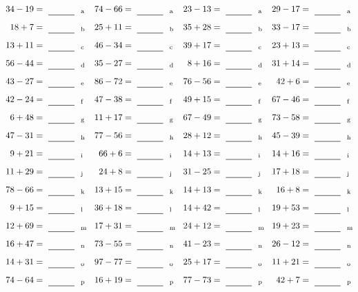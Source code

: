 \documentclass
[
  draft    = true,
  fontsize = 11pt,
  parskip  = half-
]
{scrartcl}
\begin{document}
\clearpage
\begin{align*}
    \pline{34-19}&=\rline{a}
  & \pline{74-66}&=\rline{a}
  & \pline{23-13}&=\rline{a}
  & \pline{29-17}&=\rline{a} \\[1ex]
    \pline{18+7}&=\rline{b}
  & \pline{25+11}&=\rline{b}
  & \pline{35+28}&=\rline{b}
  & \pline{33-17}&=\rline{b} \\[1ex]
    \pline{13+11}&=\rline{c}
  & \pline{46-34}&=\rline{c}
  & \pline{39+17}&=\rline{c}
  & \pline{23+13}&=\rline{c} \\[1ex]
    \pline{56-44}&=\rline{d}
  & \pline{35-27}&=\rline{d}
  & \pline{8+16}&=\rline{d}
  & \pline{31+14}&=\rline{d} \\[1ex]
    \pline{43-27}&=\rline{e}
  & \pline{86-72}&=\rline{e}
  & \pline{76-56}&=\rline{e}
  & \pline{42+6}&=\rline{e} \\[1ex]
    \pline{42-24}&=\rline{f}
  & \pline{47-38}&=\rline{f}
  & \pline{49+15}&=\rline{f}
  & \pline{67-46}&=\rline{f} \\[1ex]
    \pline{6+48}&=\rline{g}
  & \pline{11+17}&=\rline{g}
  & \pline{67-49}&=\rline{g}
  & \pline{73-58}&=\rline{g} \\[1ex]
    \pline{47-31}&=\rline{h}
  & \pline{77-56}&=\rline{h}
  & \pline{28+12}&=\rline{h}
  & \pline{45-39}&=\rline{h} \\[1ex]
    \pline{9+21}&=\rline{i}
  & \pline{66+6}&=\rline{i}
  & \pline{14+13}&=\rline{i}
  & \pline{14+16}&=\rline{i} \\[1ex]
    \pline{11+29}&=\rline{j}
  & \pline{24+8}&=\rline{j}
  & \pline{31-25}&=\rline{j}
  & \pline{17+18}&=\rline{j} \\[1ex]
    \pline{78-66}&=\rline{k}
  & \pline{13+15}&=\rline{k}
  & \pline{14+13}&=\rline{k}
  & \pline{16+8}&=\rline{k} \\[1ex]
    \pline{9+15}&=\rline{l}
  & \pline{36+18}&=\rline{l}
  & \pline{14+42}&=\rline{l}
  & \pline{19+53}&=\rline{l} \\[1ex]
    \pline{12+69}&=\rline{m}
  & \pline{17+31}&=\rline{m}
  & \pline{24+12}&=\rline{m}
  & \pline{19+23}&=\rline{m} \\[1ex]
    \pline{16+47}&=\rline{n}
  & \pline{73-55}&=\rline{n}
  & \pline{41-23}&=\rline{n}
  & \pline{26-12}&=\rline{n} \\[1ex]
    \pline{14+31}&=\rline{o}
  & \pline{97-77}&=\rline{o}
  & \pline{25+17}&=\rline{o}
  & \pline{11+21}&=\rline{o} \\[1ex]
    \pline{74-64}&=\rline{p}
  & \pline{16+19}&=\rline{p}
  & \pline{77-73}&=\rline{p}
  & \pline{42+7}&=\rline{p}
\end{align*}
\end{document}
